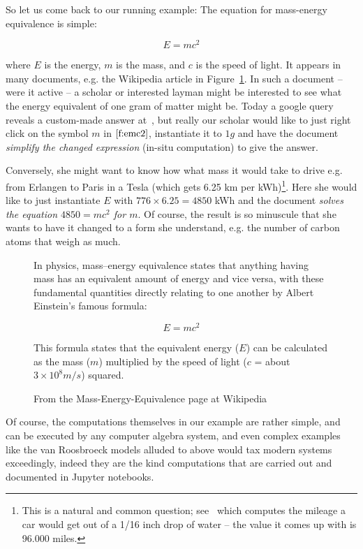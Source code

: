 So let us come back to our running example: The equation for mass-energy equivalence is
simple:

\begin{equation}\label{f:emc2}
  E=mc^2
\end{equation}

where $E$ is the energy, $m$ is the mass, and $c$ is the speed of light. It appears in
many documents, e.g. the Wikipedia article in Figure~\ref{fig:emc2-wikipedia}. In such a
document -- were it active -- a scholar or interested layman might be interested to see
what the energy equivalent of one gram of matter might be. Today a google query reveals a
custom-made answer at~\cite{Odenwald:q388}, but really our scholar would like to just right
click on the symbol $m$ in $\ref{f:emc2}$, instantiate it to $1g$ and have the document
\emph{simplify the changed expression} (in-situ computation) to give the answer.

Conversely, she might want to know how what mass it would take to drive e.g. from Erlangen
to Paris in a Tesla (which gets 6.25 km per kWh)\footnote{This is a natural and common
  question; see~\cite{RT:emc2} which computes the mileage a car would get out of a 1/16
  inch drop of water -- the value it comes up with is 96.000 miles.}. Here she would like
to just instantiate $E$ with $776 \times 6.25=4850$ kWh and the document \emph{solves the
  equation $4850=mc^2$ for $m$}. Of course, the result is so minuscule that she wants to have it changed to a
form she understand, e.g. the number of carbon atoms that weigh as much.

\begin{figure}\centering
  \begin{boxedquote}
    In physics, mass–energy equivalence states that anything having mass has an equivalent
    amount of energy and vice versa, with these fundamental quantities directly relating
    to one another by Albert Einstein's famous formula:

    \[E=mc^2\] 

    This formula states that the equivalent energy ($E$) can be calculated as the mass ($m$)
    multiplied by the speed of light ($c$ = about $3\times10^8 m/s$) squared.
  \end{boxedquote}
  \caption{From the Mass-Energy-Equivalence page at Wikipedia~\cite{WP:emc2}}
  \label{fig:emc2-wikipedia}
\end{figure}

Of course, the computations themselves in our example are rather simple, and can be
executed by any computer algebra system, and even complex examples like the van Roosbroeck
models alluded to above would tax modern systems exceedingly, indeed they are the kind
computations that are carried out and documented in Jupyter notebooks. 

